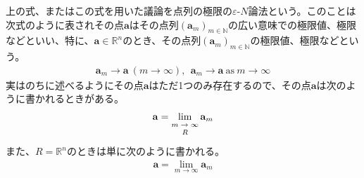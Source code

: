 \documentclass[dvipdfmx]{jsarticle}
\begin{document}
\begin{dfn}
上の式、またはこの式を用いた議論を点列の極限の$\varepsilon$-$N$論法という。このことは次式のように表されその点$\mathbf{a}$はその点列$\left( \mathbf{a}_{m} \right)_{m \in \mathbb{N}}$の広い意味での極限値、極限などといい、特に、$\mathbf{a} \in \mathbb{R}^{n}$のとき、その点列$\left( \mathbf{a}_{m} \right)_{m \in \mathbb{N}}$の極限値、極限などという。
\begin{align*}
\mathbf{a}_{m} \rightarrow \mathbf{a}\ (m \rightarrow \infty),\ \ \mathbf{a}_{m} \rightarrow \mathbf{a}\ \mathrm{as}\ m \rightarrow \infty
\end{align*}
実はのちに述べるようにその点$\mathbf{a}$はただ1つのみ存在するので、その点$\mathbf{a}$は次のように書かれるときがある。
\begin{align*}
\mathbf{a} = \lim_{\scriptsize \begin{matrix} m \rightarrow \infty \\ R \\\end{matrix}}\mathbf{a}_{m}
\end{align*}
また、$R = \mathbb{R}^{n}$のときは単に次のように書かれる。
\begin{align*}
\mathbf{a} = \lim_{m \rightarrow \infty}\mathbf{a}_{m}
\end{align*}
\end{dfn}
\end{document}
